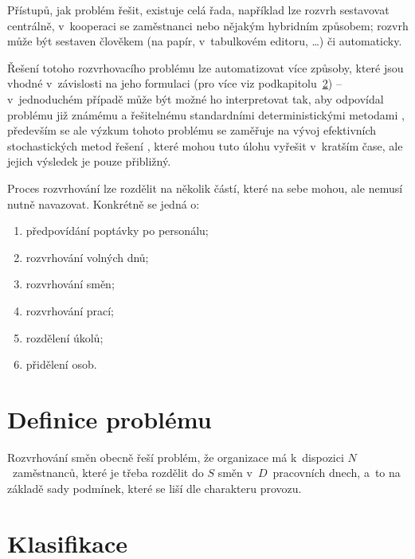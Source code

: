 \documentclass[twoside]{ctuthesis}
\begin{document}
Přístupů, jak problém řešit, existuje celá řada, například lze rozvrh sestavovat centrálně, v~kooperaci se zaměstnanci nebo nějakým hybridním způsobem; rozvrh může být sestaven člověkem (na papír, v~tabulkovém editoru, \ldots) či automaticky.

Řešení totoho rozvrhovacího problému lze automatizovat více způsoby, které jsou vhodné v~závislosti na jeho formulaci (pro více viz podkapitolu~\ref{sec:clasif}) -- v~jednoduchém případě může být možné ho interpretovat tak, aby odpovídal problému již známému a řešitelnému standardními deterministickými metodami \cite{blochliger2004modeling}, především se ale výzkum tohoto problému se zaměřuje na vývoj efektivních stochastických metod řešení \cite{adamuthe2012tabu}, které mohou tuto úlohu vyřešit v~kratším čase, ale jejich výsledek je pouze přibližný.



Proces rozvrhování lze rozdělit na několik částí, které na sebe mohou, ale nemusí nutně navazovat. \cite{ernst2004staff} Konkrétně se jedná o:
\begin{enumerate}
	\item předpovídání poptávky po personálu;
	\item rozvrhování volných dnů;
	\item rozvrhování směn;
	\item rozvrhování prací;
	\item rozdělení úkolů;
	\item přidělení osob.
\end{enumerate}

\section{Definice problému}

Rozvrhování směn obecně řeší problém, že organizace má k~dispozici $N$~zaměstnanců, které je třeba rozdělit do $S$ směn v~$D$~pracovních dnech, a~to na základě sady podmínek, které se liší dle charakteru provozu.

\section{Klasifikace}
\label{sec:clasif}
\end{document}
